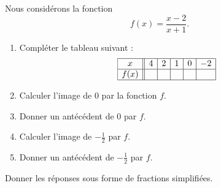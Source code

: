 
\begin{exercice}%
    \label{exosmath-0368}

    Nous considérons la fonction
    \begin{equation}
        f(x)=\frac{ x-2 }{ x+1 }.
    \end{equation}
    \begin{enumerate}
        \item
            Compléter le tableau suivant :
            \begin{equation*}
                \begin{array}[]{|c||c|c|c|c|c|}
                    \hline
                     x&4&2&1&0&-2\\
                      \hline
                      f(x)&&&&&\\ 
                      \hline 
                   \end{array}
               \end{equation*}
           \item
               Calculer l'image de \( 0\) par la fonction \( f\).
           \item
               Donner un antécédent de \( 0\) par \( f\).
           \item
               Calculer l'image de \( -\frac{ 1 }{2}\) par \( f\).
           \item
               Donner un antécédent de \( -\frac{ 1 }{2}\) par \( f\).

    \end{enumerate}
    Donner les réponses sous forme de fractions simplifiées.

\end{exercice}
